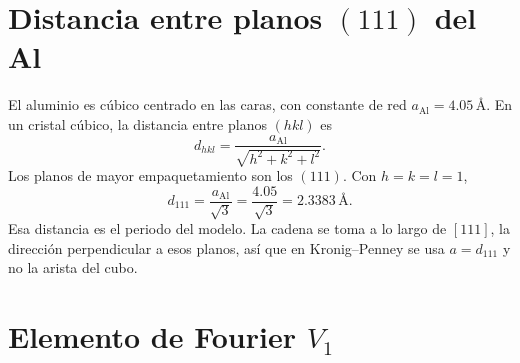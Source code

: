 \documentclass[reprint, amsmath, amssymb, aps, prb]{revtex4-2}
\begin{document}

\clearpage
\appendix

\begin{appendices}

\section{Distancia entre planos $(111)$ del Al}
\label{sec:distancia}
El aluminio es cúbico centrado en las caras, con constante de red
$a_{\mathrm{Al}}=4.05\,\text{Å}$. En un cristal cúbico, la distancia entre
planos $(hkl)$ es
\begin{equation}
d_{hkl}=\frac{a_{\mathrm{Al}}}{\sqrt{h^{2}+k^{2}+l^{2}}}.
\end{equation}
Los planos de mayor empaquetamiento son los $(111)$. Con $h=k=l=1$,
\begin{equation}
d_{111}=\frac{a_{\mathrm{Al}}}{\sqrt{3}}
=\frac{4.05}{\sqrt{3}}
=2.3383\,\text{Å}.
\end{equation}
Esa distancia es el periodo del modelo. La cadena se toma a lo largo de
$[111]$, la dirección perpendicular a esos planos, así que en Kronig--Penney
se usa $a=d_{111}$ y no la arista del cubo.

\section{Elemento de Fourier $V_1$}
\label{sec:fou}


\end{appendices}
\end{document}
